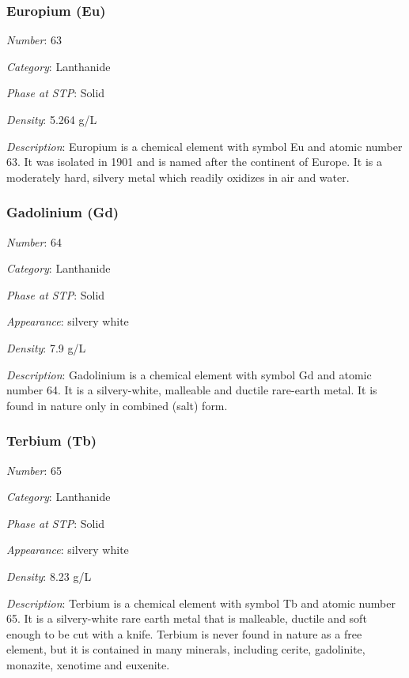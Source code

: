 \documentclass{article}
\begin{document}
\hypertarget{subsubsection::Eu}{}\subsubsection{Europium (Eu)}

\textit{Number}: 63

\textit{Category}: Lanthanide

\textit{Phase at STP}: Solid

\textit{Density}: 5.264 g/L

\textit{Description}: Europium is a chemical element with symbol Eu and atomic number 63. It was isolated in 1901 and is named after the continent of Europe. It is a moderately hard, silvery metal which readily oxidizes in air and water.

\hypertarget{subsubsection::Gd}{}\subsubsection{Gadolinium (Gd)}

\textit{Number}: 64

\textit{Category}: Lanthanide

\textit{Phase at STP}: Solid

\textit{Appearance}: silvery white

\textit{Density}: 7.9 g/L

\textit{Description}: Gadolinium is a chemical element with symbol Gd and atomic number 64. It is a silvery-white, malleable and ductile rare-earth metal. It is found in nature only in combined (salt) form.

\hypertarget{subsubsection::Tb}{}\subsubsection{Terbium (Tb)}

\textit{Number}: 65

\textit{Category}: Lanthanide

\textit{Phase at STP}: Solid

\textit{Appearance}: silvery white

\textit{Density}: 8.23 g/L

\textit{Description}: Terbium is a chemical element with symbol Tb and atomic number 65. It is a silvery-white rare earth metal that is malleable, ductile and soft enough to be cut with a knife. Terbium is never found in nature as a free element, but it is contained in many minerals, including cerite, gadolinite, monazite, xenotime and euxenite.
\end{document}
